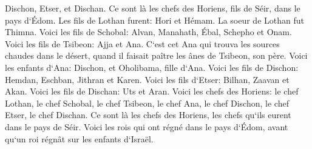 \verse Dischon, Etser, et Dischan. Ce sont là les chefs des Horiens, fils de Séir, dans le pays d`Édom. 
\verse Les fils de Lothan furent: Hori et Hémam. La soeur de Lothan fut Thimna. 
\verse Voici les fils de Schobal: Alvan, Manahath, Ébal, Schepho et Onam. 
\verse Voici les fils de Tsibeon: Ajja et Ana. C`est cet Ana qui trouva les sources chaudes dans le désert, quand il faisait paître les ânes de Tsibeon, son père. 
\verse Voici les enfants d`Ana: Dischon, et Oholibama, fille d`Ana. 
\verse Voici les fils de Dischon: Hemdan, Eschban, Jithran et Karen. 
\verse Voici les fils d`Etser: Bilhan, Zaavan et Akan. 
\verse Voici les fils de Dischan: Uts et Aran. 
\verse Voici les chefs des Horiens: le chef Lothan, le chef Schobal, le chef Tsibeon, le chef Ana, 
\verse le chef Dischon, le chef Etser, le chef Dischan. Ce sont là les chefs des Horiens, les chefs qu`ils eurent dans le pays de Séir. 
\verse Voici les rois qui ont régné dans le pays d`Édom, avant qu`un roi régnât sur les enfants d`Israël. 
